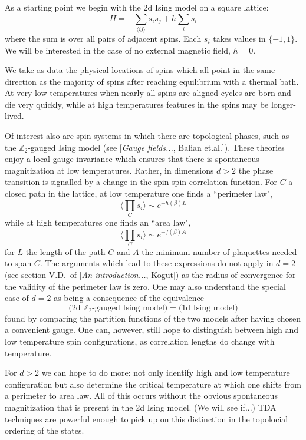 \documentclass[11pt]{article}
\begin{document}
As a starting point we begin with the 2d Ising model on a square lattice:
\begin{equation}
    H = -\sum_{\langle ij\rangle}s_is_j + h\sum_is_i
\end{equation}
where the sum is over all pairs of adjacent spins. Each $s_i$ takes values in $\{-1,1\}$. We will be interested in the case of no external magnetic field, $h=0$.

We take as data the physical locations of spins which all point in the same direction as the majority of spins after reaching equilibrium with a thermal bath. At very low temperatures when nearly all spins are aligned cycles are born and die very quickly, while at high temperatures features in the spins may be longer-lived.


Of interest also are spin systems in which there are topological phases, such as the $\mathbb{Z}_2$-gauged Ising model (see [\textit{Gauge fields...}, Balian et.al.]). These theories enjoy a local gauge invariance which ensures that there is spontaneous magnitization at low temperatures. Rather, in dimensions $d>2$ the phase transition is signalled by a change in the spin-spin correlation function. For $C$ a closed path in the lattice, at low temperature one finds a ``perimeter law",
\begin{equation}
    \langle\prod_C s_i\rangle \sim e^{-h(\beta)L}
\end{equation}
while at high temperatures one finds an ``area law",
\begin{equation}
    \langle\prod_C s_i\rangle \sim e^{-f(\beta)A}
\end{equation}
for $L$ the length of the path $C$ and $A$ the minimum number of plaquettes needed to span $C$. The arguments which lead to these expressions do not apply in $d=2$ (see section V.D.~of [\textit{An introduction...}, Kogut]) as the radius of convergence for the validity of the perimeter law is zero. One may also understand the special case of $d=2$ as being a consequence of the equivalence
\begin{equation}
    \Big(\text{2d }\mathbb{Z}_2\text{-gauged Ising model}\Big) = \Big( \text{1d Ising model} \Big)
\end{equation}
found by comparing the partition functions of the two models after having chosen a convenient gauge. One can, however, still hope to distinguish between high and low temperature spin configurations, as correlation lengths do change with temperature.

For $d>2$ we can hope to do more: not only identify high and low temperature configuration but also determine the critical temperature at which one shifts from a perimeter to area law. All of this occurs without the obvious spontaneous magnitization that is present in the 2d Ising model. (We will see if...) TDA techniques are powerful enough to pick up on this distinction in the topolocial ordering of the states.
\end{document}
